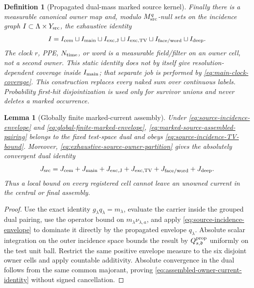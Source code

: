 \documentclass[11pt]{article}
\newtheorem{lemma}[theorem]{Lemma}
\newtheorem{definition}[theorem]{Definition}
\begin{document}
\begin{definition}[Propagated dual-mass marked source kernel]
Finally there is a measurable canonical owner map and, modulo
$M_{\rm src}^{q}$-null sets on the incidence graph
$I\subset\Lambda\times Y_{\rm src}$, the exhaustive identity
\begin{equation}
\label{eq:exhaustive-source-owner-partition}
 I=I_{\rm cem}\sqcup I_{\rm main}\sqcup
 I_{\rm exc,J}\sqcup I_{\rm exc,TV}\sqcup
 I_{\rm face/word}\sqcup I_{\rm deep}.
\end{equation}
The clock $r$, PPE, $N_{\rm time}$, or word is a measurable field/filter on
an owner cell, not a second owner.  This static identity does not by itself
give resolution-dependent coverage inside $I_{\rm main}$; that separate job
is performed by \eqref{eq:main-clock-coverage}.  This construction replaces every
naked sum over continuous labels.  Probability first-hit disjointization is
used only for survivor unions and never deletes a marked occurrence.
\end{definition}

\begin{lemma}[Globally finite marked-current assembly]
\label{lem:globally-finite-marked-current}
Under \eqref{eq:source-incidence-envelope} and
\eqref{eq:global-finite-marked-envelope},
\eqref{eq:marked-source-assembled-pairing} belongs to the fixed test-space
dual and obeys \eqref{eq:source-incidence-TV-bound}.  Moreover,
\eqref{eq:exhaustive-source-owner-partition} gives the absolutely convergent
dual identity
\begin{equation}
\label{eq:assembled-owner-current-identity}
 J_{\rm src}=J_{\rm cem}+J_{\rm main}+J_{\rm exc,J}+J_{\rm exc,TV}
              +J_{\rm face/word}+J_{\rm deep}.
\end{equation}
Thus a local bound on every registered cell cannot leave an unowned current
in the central or final assembly.
\end{lemma}

\begin{proof}
Use the exact identity $g_\lambda q_\lambda=m_\lambda$, evaluate the
carrier inside the grouped dual pairing, use the operator bound on
$m_\lambda\nu_{\lambda,a}$, and apply
\eqref{eq:source-incidence-envelope} to dominate it directly by the
propagated envelope $q_\lambda$.  Absolute scalar integration on the outer
incidence space bounds the result by $Q_{s,\mathfrak d}^{\rm prop}$
uniformly on the test unit ball.
Restrict the same positive envelope measure to the six disjoint owner cells
and apply countable additivity.  Absolute convergence in the dual follows
from the same common majorant, proving
\eqref{eq:assembled-owner-current-identity} without signed cancellation.
\end{proof}
\end{document}
